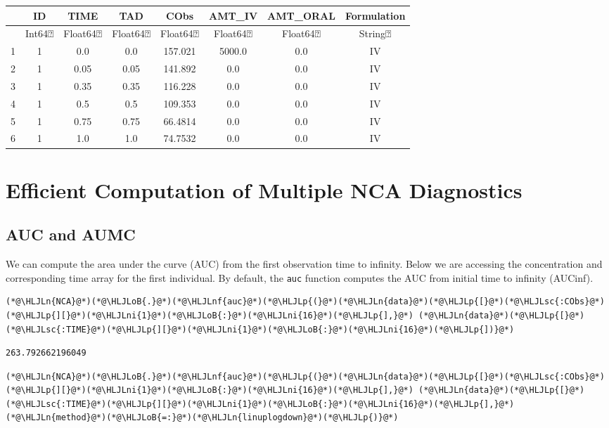 \documentclass[12pt,a4paper]{article}
\newcommand{\HLJLn}[1]{#1}
\newcommand{\HLJLnf}[1]{\textcolor[RGB]{66,102,213}{#1}}
\newcommand{\HLJLsc}[1]{\textcolor[RGB]{201,61,57}{#1}}
\newcommand{\HLJLni}[1]{\textcolor[RGB]{59,151,46}{#1}}
\newcommand{\HLJLoB}[1]{\textcolor[RGB]{102,102,102}{\textbf{#1}}}
\newcommand{\HLJLp}[1]{#1}
\begin{document}
\begin{tabular}{r|ccccccc}
	& ID & TIME & TAD & CObs & AMT\_IV & AMT\_ORAL & Formulation\\
	\hline
	& Int64⍰ & Float64⍰ & Float64⍰ & Float64⍰ & Float64⍰ & Float64⍰ & String⍰\\
	\hline
	1 & 1 & 0.0 & 0.0 & 157.021 & 5000.0 & 0.0 & IV \\
	2 & 1 & 0.05 & 0.05 & 141.892 & 0.0 & 0.0 & IV \\
	3 & 1 & 0.35 & 0.35 & 116.228 & 0.0 & 0.0 & IV \\
	4 & 1 & 0.5 & 0.5 & 109.353 & 0.0 & 0.0 & IV \\
	5 & 1 & 0.75 & 0.75 & 66.4814 & 0.0 & 0.0 & IV \\
	6 & 1 & 1.0 & 1.0 & 74.7532 & 0.0 & 0.0 & IV \\
\end{tabular}


\section{Efficient Computation of Multiple NCA Diagnostics}
\subsection{AUC and AUMC}
We can compute the area under the curve (AUC) from the first observation time to infinity. Below we are accessing the concentration and corresponding time array for the first individual. By default, the \texttt{auc} function computes the AUC from initial time to infinity (AUCinf).


\begin{lstlisting}
(*@\HLJLn{NCA}@*)(*@\HLJLoB{.}@*)(*@\HLJLnf{auc}@*)(*@\HLJLp{(}@*)(*@\HLJLn{data}@*)(*@\HLJLp{[}@*)(*@\HLJLsc{:CObs}@*)(*@\HLJLp{][}@*)(*@\HLJLni{1}@*)(*@\HLJLoB{:}@*)(*@\HLJLni{16}@*)(*@\HLJLp{],}@*) (*@\HLJLn{data}@*)(*@\HLJLp{[}@*)(*@\HLJLsc{:TIME}@*)(*@\HLJLp{][}@*)(*@\HLJLni{1}@*)(*@\HLJLoB{:}@*)(*@\HLJLni{16}@*)(*@\HLJLp{])}@*)
\end{lstlisting}

\begin{lstlisting}
263.792662196049
\end{lstlisting}


\begin{lstlisting}
(*@\HLJLn{NCA}@*)(*@\HLJLoB{.}@*)(*@\HLJLnf{auc}@*)(*@\HLJLp{(}@*)(*@\HLJLn{data}@*)(*@\HLJLp{[}@*)(*@\HLJLsc{:CObs}@*)(*@\HLJLp{][}@*)(*@\HLJLni{1}@*)(*@\HLJLoB{:}@*)(*@\HLJLni{16}@*)(*@\HLJLp{],}@*) (*@\HLJLn{data}@*)(*@\HLJLp{[}@*)(*@\HLJLsc{:TIME}@*)(*@\HLJLp{][}@*)(*@\HLJLni{1}@*)(*@\HLJLoB{:}@*)(*@\HLJLni{16}@*)(*@\HLJLp{],}@*) (*@\HLJLn{method}@*)(*@\HLJLoB{=:}@*)(*@\HLJLn{linuplogdown}@*)(*@\HLJLp{)}@*)
\end{lstlisting}
\end{document}
